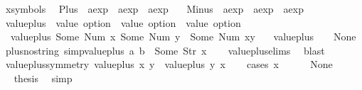 \begin{isabellebody}
\isanewline
{}\isamarkupfalse%
\ {\isacharparenleft}xsymbols{\isacharparenright}\isanewline
\ \ Plus\ {\isacharcolon}{\isacharcolon}\ {\isachardoublequoteopen}aexp\ {\isasymRightarrow}\ aexp\ {\isasymRightarrow}\ aexp{\isachardoublequoteclose}\ \isanewline
\ \ Minus\ {\isacharcolon}{\isacharcolon}\ {\isachardoublequoteopen}aexp\ {\isasymRightarrow}\ aexp\ {\isasymRightarrow}\ aexp{\isachardoublequoteclose}\ \isanewline
\isanewline
{}\isamarkupfalse%
\ value{\isacharunderscore}plus\ {\isacharcolon}{\isacharcolon}\ {\isachardoublequoteopen}value\ option\ {\isasymRightarrow}\ value\ option\ {\isasymRightarrow}\ value\ option{\isachardoublequoteclose}\ \ \isanewline
\ \ {\isachardoublequoteopen}value{\isacharunderscore}plus\ {\isacharparenleft}Some\ {\isacharparenleft}Num\ x{\isacharparenright}{\isacharparenright}\ {\isacharparenleft}Some\ {\isacharparenleft}Num\ y{\isacharparenright}{\isacharparenright}\ {\isacharequal}\ Some\ {\isacharparenleft}Num\ {\isacharparenleft}x{\isacharplus}y{\isacharparenright}{\isacharparenright}{\isachardoublequoteclose}\ {\isacharbar}\isanewline
\ \ {\isachardoublequoteopen}value{\isacharunderscore}plus\ {\isacharunderscore}\ {\isacharunderscore}\ {\isacharequal}\ None{\isachardoublequoteclose}\isanewline
\isanewline
{}\isamarkupfalse%
\ plus{\isacharunderscore}no{\isacharunderscore}string\ {\isacharbrackleft}simp{\isacharbrackright}{\isacharcolon}{\isachardoublequoteopen}value{\isacharunderscore}plus\ a\ b\ {\isasymnoteq}\ Some\ {\isacharparenleft}Str\ x{\isacharparenright}{\isachardoublequoteclose}\isanewline
%
\isadelimproof
\ \ %
\endisadelimproof
%
\isatagproof
{}\isamarkupfalse%
\ value{\isacharunderscore}plus{\isachardot}elims\ \isamarkupfalse%
\ blast%
\endisatagproof
{\isafoldproof}%
%
\isadelimproof
\isanewline
%
\endisadelimproof
\isanewline
{}\isamarkupfalse%
\ value{\isacharunderscore}plus{\isacharunderscore}symmetry{\isacharcolon}\ {\isachardoublequoteopen}value{\isacharunderscore}plus\ x\ y\ {\isacharequal}\ value{\isacharunderscore}plus\ y\ x{\isachardoublequoteclose}\isanewline
%
\isadelimproof
\ \ %
\endisadelimproof
%
\isatagproof
{}\isamarkupfalse%
\ {\isacharparenleft}cases\ x{\isacharparenright}\isanewline
\ \ \ \ \isamarkupfalse%
\ None\isanewline
\ \ \ \ \isamarkupfalse%
\ \isamarkupfalse%
\ {\isacharquery}thesis\ \isamarkupfalse%
\ simp\isanewline
\ \ \isamarkupfalse%
\isanewline
\ \ \ \ \isamarkupfalse%

\end{isabellebody}
